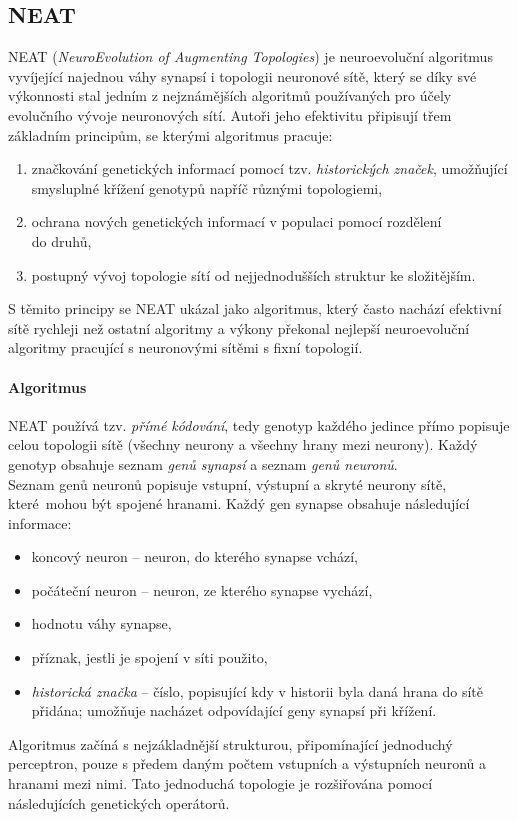 \subsection{NEAT} \label{NN - NEAT}
NEAT (\emph{NeuroEvolution of Augmenting Topologies})
\citep{stanley2002evolving} je neuroevoluční algoritmus vyvíjející najednou
váhy synapsí i topologii neuronové sítě, který se díky své výkonnosti stal
jedním z nejznámějších algoritmů používaných pro účely evolučního vývoje
neuronových sítí. Autoři jeho efektivitu připisují třem základním principům, se
kterými algoritmus pracuje:
\begin{enumerate}
    \item značkování genetických informací pomocí tzv. \emph{historických značek},
        umožňující smysluplné křížení genotypů napříč různými topologiemi,
   \item ochrana nových genetických informací v populaci pomocí rozdělení\\
       do druhů,
    \item postupný vývoj topologie sítí od nejjednodušších struktur ke
        složitějším.
\end{enumerate}
S těmito principy se NEAT ukázal jako algoritmus, který často nachází efektivní
sítě rychleji než ostatní algoritmy a výkony překonal nejlepší neuroevoluční
algoritmy pracující s neuronovými sítěmi s fixní topologií.

\paragraph{Algoritmus}
NEAT používá tzv. \emph{přímé kódování}, tedy genotyp každého jedince přímo
popisuje celou topologii sítě (všechny neurony a všechny hrany mezi neurony).
Každý genotyp obsahuje seznam \emph{genů synapsí} a seznam \emph{genů neuronů}.
\\Seznam genů neuronů popisuje vstupní, výstupní a skryté neurony sítě,
které~mohou být spojené hranami. Každý gen synapse obsahuje následující
informace: 
\begin{itemize}
    \item koncový neuron -- neuron, do kterého synapse vchází,
    \item počáteční neuron -- neuron, ze kterého synapse vychází,
    \item hodnotu váhy synapse,
    \item příznak, jestli je spojení v síti použito,
    \item \emph{historická značka} -- číslo, popisující kdy v historii
        byla daná hrana do sítě přidána; umožňuje nacházet
        odpovídající geny synapsí při křížení.
\end{itemize}
Algoritmus začíná s nejzákladnější strukturou, připomínající jednoduchý
perceptron, pouze s předem daným počtem vstupních a výstupních neuronů a
hranami mezi nimi. Tato jednoduchá topologie je rozšiřována pomocí
následujících genetických operátorů.


